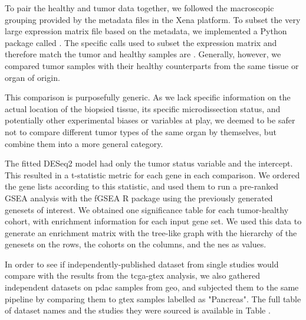 To pair the healthy and tumor data together, we followed the macroscopic grouping provided by the metadata files in the Xena platform. To subset the very large expression matrix file based on the metadata, we implemented a Python package called . The specific calls used to subset the expression matrix and therefore match the tumor and healthy samples are . Generally, however, we compared tumor samples with their healthy counterparts from the same tissue or organ of origin.

This comparison is purposefully generic. As we lack specific information on the actual location of the biopsied tissue, its specific microdissection status, and potentially other experimental biases or variables at play, we deemed to be safer not to compare different tumor types of the same organ by themselves, but combine them into a more general category.


The fitted DESeq2 model had only the tumor status variable and the intercept. This resulted in a t-statistic metric for each gene in each comparison. We ordered the gene lists according to this statistic, and used them to run a pre-ranked GSEA analysis with the fGSEA R package \cite{korotkevichFastGeneSet2021} using the previously generated genesets of interest.
We obtained one significance table for each tumor-healthy cohort, with enrichment information for each input gene set. We used this data to generate an enrichment matrix with the tree-like graph with the hierarchy of the genesets on the rows, the cohorts on the columns, and the \gls{nes} as values.

In order to see if independently-published dataset from single studies would compare with the results from the \gls{tcga}-\gls{gtex} analysis, we also gathered  independent datasets on \gls{pdac} samples from \gls{geo}, and subjected them to the same pipeline by comparing them to \gls{gtex} samples labelled as "Pancreas". The full table of dataset names and the studies they were sourced is available in Table .

